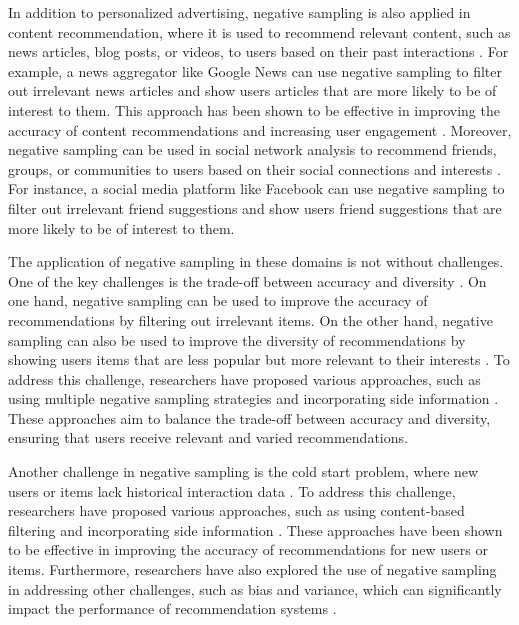 \documentclass[11pt,a4paper]{article}
\begin{document}
In addition to personalized advertising, negative sampling is also applied in content recommendation, where it is used to recommend relevant content, such as news articles, blog posts, or videos, to users based on their past interactions \cite{doi:10.1209/0295-5075/82/58007}. For example, a news aggregator like Google News can use negative sampling to filter out irrelevant news articles and show users articles that are more likely to be of interest to them. This approach has been shown to be effective in improving the accuracy of content recommendations and increasing user engagement \cite{doi:10.1073/pnas.1000488107}. Moreover, negative sampling can be used in social network analysis to recommend friends, groups, or communities to users based on their social connections and interests \cite{doi:10.23919/eusipco.2017.8081498}. For instance, a social media platform like Facebook can use negative sampling to filter out irrelevant friend suggestions and show users friend suggestions that are more likely to be of interest to them.

The application of negative sampling in these domains is not without challenges. One of the key challenges is the trade-off between accuracy and diversity \cite{doi:10.1587/transinf.2017edr0003}. On one hand, negative sampling can be used to improve the accuracy of recommendations by filtering out irrelevant items. On the other hand, negative sampling can also be used to improve the diversity of recommendations by showing users items that are less popular but more relevant to their interests \cite{arxiv:1905.06589}. To address this challenge, researchers have proposed various approaches, such as using multiple negative sampling strategies \cite{doi:10.24963/ijcai.2017/446} and incorporating side information \cite{doi:10.1609/aaai.v32i1.11835}. These approaches aim to balance the trade-off between accuracy and diversity, ensuring that users receive relevant and varied recommendations.

Another challenge in negative sampling is the cold start problem, where new users or items lack historical interaction data \cite{doi:10.1016/j.knosys.2011.07.021}. To address this challenge, researchers have proposed various approaches, such as using content-based filtering \cite{doi:10.1109/access.2019.2905534} and incorporating side information \cite{arxiv:1805.09023}. These approaches have been shown to be effective in improving the accuracy of recommendations for new users or items. Furthermore, researchers have also explored the use of negative sampling in addressing other challenges, such as bias and variance, which can significantly impact the performance of recommendation systems \cite{doi:10.1016/j.elerap.2019.100879}.
\end{document}
